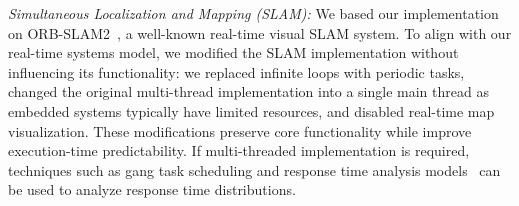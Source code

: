     \textit{Simultaneous Localization and Mapping (SLAM):}
    We based our implementation on ORB-SLAM2~\cite{murORB2}, a well-known real-time visual SLAM system.
    To align with our real-time systems model, we modified the SLAM implementation without influencing its functionality: 
	we replaced infinite loops with periodic tasks, changed the original multi-thread implementation into a single main thread as embedded systems typically have limited resources, 
	and disabled real-time map visualization.
    These modifications preserve core functionality while improve execution-time predictability.
    If multi-threaded implementation is required, techniques such as gang task scheduling and response time analysis models~\cite{Sun2024StrictPF} can be used to analyze response time distributions.

